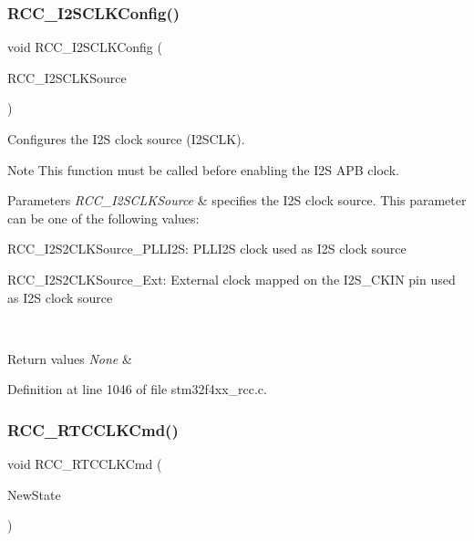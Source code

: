 \subsubsection{\texorpdfstring{R\+C\+C\+\_\+\+I2\+S\+C\+L\+K\+Config()}{RCC\_I2SCLKConfig()}}
{\footnotesize\ttfamily void R\+C\+C\+\_\+\+I2\+S\+C\+L\+K\+Config (\begin{DoxyParamCaption}\item[{uint32\+\_\+t}]{R\+C\+C\+\_\+\+I2\+S\+C\+L\+K\+Source }\end{DoxyParamCaption})}



Configures the I2S clock source (I2\+S\+C\+LK). 

\begin{DoxyNote}{Note}
This function must be called before enabling the I2S A\+PB clock. 
\end{DoxyNote}

\begin{DoxyParams}{Parameters}
{\em R\+C\+C\+\_\+\+I2\+S\+C\+L\+K\+Source} & specifies the I2S clock source. This parameter can be one of the following values\+: \begin{DoxyItemize}
\item R\+C\+C\+\_\+\+I2\+S2\+C\+L\+K\+Source\+\_\+\+P\+L\+L\+I2S\+: P\+L\+L\+I2S clock used as I2S clock source \item R\+C\+C\+\_\+\+I2\+S2\+C\+L\+K\+Source\+\_\+\+Ext\+: External clock mapped on the I2\+S\+\_\+\+C\+K\+IN pin used as I2S clock source \end{DoxyItemize}
\\
\hline
\end{DoxyParams}

\begin{DoxyRetVals}{Return values}
{\em None} & \\
\hline
\end{DoxyRetVals}


Definition at line 1046 of file stm32f4xx\+\_\+rcc.\+c.

\mbox{\label{group___r_c_c___group3_ga9802f84846df2cea8e369234ed13b159}} 
\subsubsection{\texorpdfstring{R\+C\+C\+\_\+\+R\+T\+C\+C\+L\+K\+Cmd()}{RCC\_RTCCLKCmd()}}
{\footnotesize\ttfamily void R\+C\+C\+\_\+\+R\+T\+C\+C\+L\+K\+Cmd (\begin{DoxyParamCaption}\item[{Functional\+State}]{New\+State }\end{DoxyParamCaption})}



